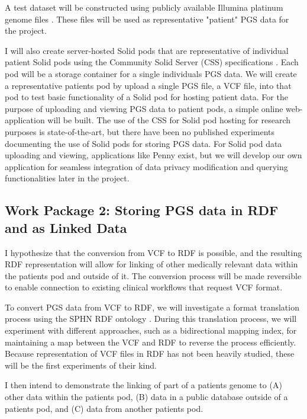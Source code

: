 \documentclass[runningheads]{llncs}
\begin{document}
A test dataset will be constructed using publicly available Illumina platinum genome files \cite{noauthor_platinum_nodate}. 
These files will be used as representative "patient" PGS data for the project. 

I will also create server-hosted Solid pods that are representative of individual patient Solid pods using the Community Solid Server (CSS) specifications \cite{css}. 
Each pod will be a storage container for a single individual\textquotesingle s PGS data. 
We will create a representative patient\textquotesingle s pod by upload a single PGS file, a VCF file, into that pod to test basic functionality of a Solid pod for hosting patient data. 
For the purpose of uploading and viewing PGS data to patient pods, a simple online web-application will be built.
The use of the CSS for Solid pod hosting for research purposes is state-of-the-art, but there have been no published experiments documenting the use of Solid pods for storing PGS data. 
For Solid pod data uploading and viewing, applications like Penny \cite{penny} exist, but we will develop our own application for seamless integration of data privacy modification and querying functionalities later in the project. 


\subsection{Work Package 2:  Storing PGS data in RDF and as Linked Data}

I hypothesize that the conversion from VCF to RDF is possible, and the resulting RDF representation will allow for linking of other medically relevant data within the patient\textquotesingle s pod and outside of it.
The conversion process will be made reversible to enable connection to existing clinical workflows that request VCF format. 

To convert PGS data from VCF to RDF, we will investigate a format translation process using the SPHN RDF ontology \cite{van_der_horst_bridging_2023}. 
During this translation process, we will experiment with different approaches, such as a bidirectional mapping index, for maintaining a map between the VCF and RDF to reverse the process efficiently.
Because representation of VCF files in RDF has not been heavily studied, these will be the first experiments of their kind.

I then intend to demonstrate the linking of part of a patient\textquotesingle s genome to
(A) other data within the patient\textquotesingle s pod, 
(B) data in a public database outside of a patient\textquotesingle s pod, and
(C) data from another patient\textquotesingle s pod.
\end{document}
